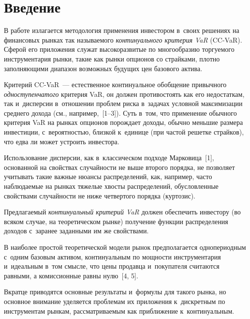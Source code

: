 
\thispagestyle{headings}

\begin{multicols}{2}

\label{st\stat}
   
  \section{Введение}
  
\vspace*{-2pt}
  
  В работе излагается методология применения инвестором в~своих решениях 
на финансовых рынках так называемого \textit{континуального критерия VaR} 
(CC-VaR). Сферой его приложения служат высокоразвитые по многообразию 
торгуемого инструментария рынки, такие как рынки опционов со страйками, 
плотно заполняющими диапазон возможных будущих цен базового актива. 
  
  Критерий CC-VaR~--- естественное континуальное обобщение привычного 
\textit{одноступенчатого} критерия VaR, он должен противостоять как его 
недостаткам, так и~дисперсии в~отношении проблем риска в~задачах условной 
максимизации среднего дохода (см., например,~[1--3]). Суть в~том, что 
применение обычного критерия VaR на рынках опционов по\-рож\-да\-ет доходы, 
обычно меньшие размера инвестиции, с~вероятностью, близкой к~единице (при 
частой решетке страйков), что едва ли может устроить инвестора.
   
Использование дисперсии, как в~классическом подходе Марковица~[1], 
основанной на свойствах случайности не выше второго порядка, не позволяет 
учитывать такие важные нюансы распределений, как, например, часто 
наблюдаемые на рынках тяжелые хвосты распределений, обусловленные 
свойствами случайности не ниже четвертого порядка (куртозис). 
  
  Предлагаемый \textit{континуальный критерий VaR} должен обеспечить 
инвестору (во всяком случае, на теоретическом рынке) получение функции 
распределения доходов с~заранее заданными им же свойствами.
  
  В наиболее простой теоретической модели рынок предполагается 
однопериодным с~одним базовым активом, континуальным по мощности 
инструментария и~идеальным в~том смысле, что цены продавца и~покупателя 
считаются равными, а комиссионные равны нулю~[4, 5].
  
  Вкратце приводятся основные результаты и~формулы для такого рынка, но 
основное внимание уделяется проблемам их приложения к~дискретным по 
инструментам рынкам, рас\-смат\-ри\-ва\-емым как приближение к~континуальным. 


\end{multicols}
